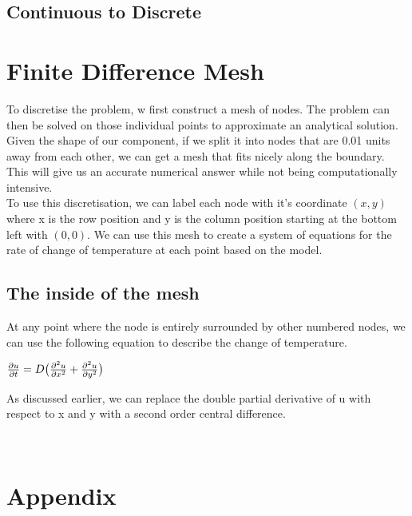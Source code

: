 \documentclass[12pt,a4paper]{article}
\begin{document}
\subsection{Continuous to Discrete}
\clearpage

\section{Finite Difference Mesh}
To discretise the problem, w first construct a mesh of nodes. The problem can then be solved on those individual points to approximate an analytical solution. Given the shape of our component, if we split it into nodes that are 0.01 units away from each other, we can get a mesh that fits nicely along the boundary. This will give us an accurate numerical answer while not being computationally intensive. 
\\
To use this discretisation, we can label each node with it's coordinate $(x,y)$ where x is the row position and y is the column position starting at the bottom left with $(0,0)$. We can use this mesh to create a system of equations for the rate of change of temperature at each point based on the model.
\subsection{The inside of the mesh}
At any point where the node is entirely surrounded by other numbered nodes, we can use the following equation to describe the change of temperature.
\begin{center}
$\frac{\partial u}{\partial t}=D\big{(}\frac{\partial^2 u}{\partial x^2}+\frac{\partial^2 u}{\partial y^2}\big{)}$
\end{center}
As discussed earlier, we can replace the double partial derivative of u with respect to x and y with a second order central difference. %
\begin{center}
$ $
\end{center}


\clearpage
\section{Appendix}
\end{document}

